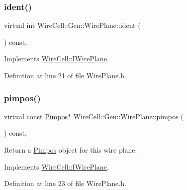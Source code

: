 \subsubsection{\texorpdfstring{ident()}{ident()}}
{\footnotesize\ttfamily virtual int Wire\+Cell\+::\+Gen\+::\+Wire\+Plane\+::ident (\begin{DoxyParamCaption}{ }\end{DoxyParamCaption}) const\hspace{0.3cm}{\ttfamily [inline]}, {\ttfamily [virtual]}}



Implements \hyperlink{class_wire_cell_1_1_i_wire_plane_af6ee6155a91ec58ba2abbec9bab63a39}{Wire\+Cell\+::\+I\+Wire\+Plane}.



Definition at line 21 of file Wire\+Plane.\+h.

\mbox{\label{class_wire_cell_1_1_gen_1_1_wire_plane_adb80d740c4f245ae7fa6b26ccd539685}} 
\subsubsection{\texorpdfstring{pimpos()}{pimpos()}}
{\footnotesize\ttfamily virtual const \hyperlink{class_wire_cell_1_1_pimpos}{Pimpos}$\ast$ Wire\+Cell\+::\+Gen\+::\+Wire\+Plane\+::pimpos (\begin{DoxyParamCaption}{ }\end{DoxyParamCaption}) const\hspace{0.3cm}{\ttfamily [inline]}, {\ttfamily [virtual]}}



Return a \hyperlink{class_wire_cell_1_1_pimpos}{Pimpos} object for this wire plane. 



Implements \hyperlink{class_wire_cell_1_1_i_wire_plane_a906ad17d425080349082a719b4362a36}{Wire\+Cell\+::\+I\+Wire\+Plane}.



Definition at line 23 of file Wire\+Plane.\+h.

\mbox{\label{class_wire_cell_1_1_gen_1_1_wire_plane_aabd90e5ca70c31d41015980d7f320abe}} 

